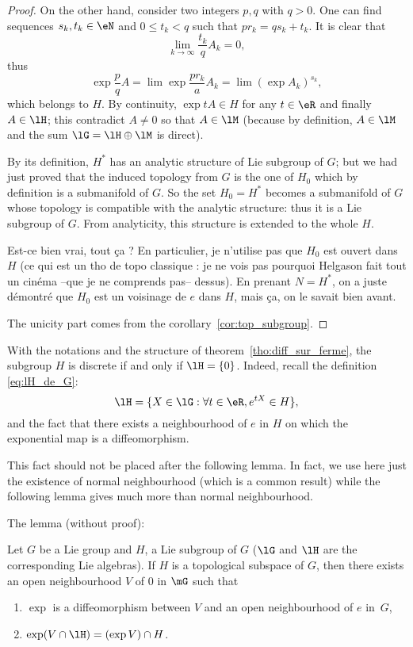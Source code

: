 \begin{proof}
On the other hand, consider two integers $p,q$ with $q>0$. One can find sequences $s_k,t_k\in\eN$ and $0\leq t_k<q$ such that $pr_k=qs_k+t_k$. It is clear that
\begin{equation}
  \lim_{k\to\infty}\frac{t_k}{q}A_k=0,
\end{equation}
thus
\[
   \exp \frac{p}{q}A=\lim \exp\frac{pr_k}{a}A_k=\lim (\exp A_k)^{s_k},
\]
which belongs to $H$. By continuity, $\exp tA\in H$ for any $t\in\eR$ and finally $A\in\lH$; this contradict $A\neq 0$ so that $A\in\lM$ (because by definition, $A\in\lM$ and the sum $\lG=\lH\oplus\lM$ is direct).

By its definition, $H^*$ has an analytic structure of Lie subgroup of $G$; but we had just proved that the induced topology from $G$ is the one of $H_0$ which by definition is a submanifold of $G$. So the set $H_0=H^*$ becomes a submanifold of $G$ whose topology is compatible with the analytic structure: thus it is a Lie subgroup of $G$. From analyticity, this structure is extended to the whole $H$.

\begin{probleme}
Est-ce bien vrai, tout \c ca ? En particulier, je n'utilise pas que $H_0$ est ouvert dans $H$ (ce qui est un tho de topo classique : je ne vois pas pourquoi Helgason fait tout un cin\'ema --que je ne comprends pas-- dessus). En prenant $N=H^*$, on a juste d\'emontr\'e que $H_0$ est un voisinage de $e$ dans $H$, mais ça, on le savait bien avant.
\end{probleme}

The unicity part comes from the corollary~\ref{cor:top_subgroup}.
\end{proof}


With the notations and the structure of theorem~\ref{tho:diff_sur_ferme}, the subgroup $H$ is discrete if and only if $\lH=\{0\}$. Indeed, recall the definition \eqref{eq:lH_de_G}:
\[
  \lH=\{X\in\lG: \forall t\in\eR, e^{tX}\in H\},
\]
and the fact that there exists a neighbourhood of $e$ in $H$ on which the exponential map is a diffeomorphism.

\begin{remark}
This fact should not be placed after the following lemma. In fact, we use here just the existence of normal neighbourhood (which is a common result) while the following lemma gives much more than normal neighbourhood.
\end{remark}

The lemma (without proof):

\begin{lemma}
 Let $G$ be a Lie group and $H$, a Lie subgroup of $G$ ($\lG$ and $\lH$ are the corresponding Lie algebras). If $H$ is a topological subspace of $G$, then there exists an open neighbourhood $V$ of $0$ in $\mG$ such that
 \begin{enumerate}
 \item $\exp$ is a diffeomorphism between $V$ and an open neighbourhood of $e$ in~$G$,
 \item $\exp(V\cap\lH)=(\exp V)\cap H$.
 \end{enumerate}
\label{lem:sugroup_normal}
\end{lemma}

